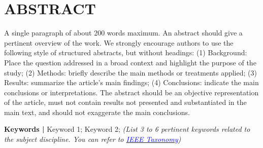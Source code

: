 \chapter*{ABSTRACT}
    A single paragraph of about 200 words maximum. An abstract should give a pertinent overview of the work. We strongly encourage authors to use the following style of structured abstracts, but without headings: (1) Background: Place the question addressed in a broad context and highlight the purpose of the study; (2) Methods: briefly describe the main methods or treatments applied; (3) Results: summarize the article’s main findings; (4) Conclusions: indicate the main conclusions or interpretations. The abstract should be an objective representation of the article, must not contain results not presented and substantiated in the main text, and should not exaggerate the main conclusions.

    \noindent
    \textbf{Keywords | } Keyword 1; Keyword 2; 
    \textit{(List 3 to 6 pertinent keywords related to the subject discipline. You can refer to \href{https://www.ieee.org/content/dam/ieee-org/ieee/web/org/pubs/ieee-taxonomy.pdf}{\textcolor{blue}{IEEE Taxonomy}}) }

{}